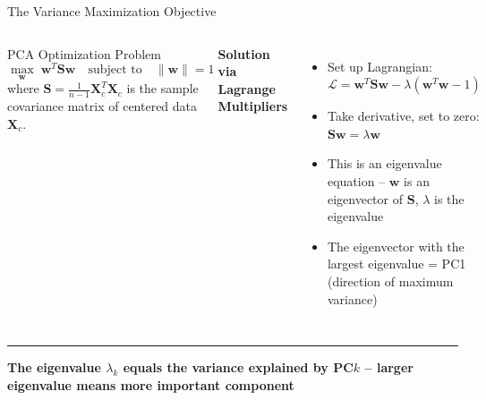 \documentclass[8pt,aspectratio=169]{beamer}
\newcommand{\bottomnote}[1]{%
\vfill
\vspace{-2mm}
\textcolor{mllavender2}{\rule{\textwidth}{0.4pt}}
\vspace{1mm}
\footnotesize
\textbf{#1}
}
\newenvironment{compactlist}{%
  \begin{itemize}%
    \setlength{\itemsep}{2pt}%
    \setlength{\parskip}{0pt}%
    \setlength{\parsep}{0pt}%
}{%
  \end{itemize}%
}
\begin{document}
\begin{frame}[t]{The Variance Maximization Objective}
\begin{columns}[T]
\small

\vspace{2mm}
\begin{block}{PCA Optimization Problem}
\[
\max_{\mathbf{w}} \; \mathbf{w}^T \mathbf{S} \mathbf{w} \quad \text{subject to} \quad \|\mathbf{w}\| = 1
\]
where $\mathbf{S} = \frac{1}{n-1}\mathbf{X}_c^T \mathbf{X}_c$ is the sample covariance matrix of centered data $\mathbf{X}_c$.
\end{block}

\vspace{2mm}
\textbf{Solution via Lagrange Multipliers}
\begin{compactlist}
\item Set up Lagrangian: $\mathcal{L} = \mathbf{w}^T \mathbf{S} \mathbf{w} - \lambda(\mathbf{w}^T\mathbf{w} - 1)$
\item Take derivative, set to zero: $\mathbf{S}\mathbf{w} = \lambda \mathbf{w}$
\item This is an eigenvalue equation -- $\mathbf{w}$ is an eigenvector of $\mathbf{S}$, $\lambda$ is the eigenvalue
\item The eigenvector with the largest eigenvalue = PC1 (direction of maximum variance)
\end{compactlist}
\end{columns}

\bottomnote{The eigenvalue $\lambda_k$ equals the variance explained by PC$k$ -- larger eigenvalue means more important component}
\end{frame}
\end{document}
